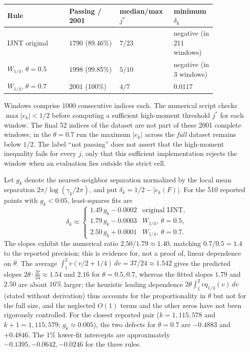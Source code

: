 \documentclass[11pt,a4paper]{article}
\numberwithin{equation}{section}
\theoremstyle{definition}
\theoremstyle{remark}
\begin{document}
\begin{center}\small
\begin{tabular}{@{}p{0.27\linewidth}p{0.22\linewidth}p{0.19\linewidth}p{0.17\linewidth}@{}}
\toprule
Rule & Passing / 2001 & median/max $j^*$ & minimum $\delta_k$\\
\midrule
IJNT original & $1790$ (89.46\%) & $7/23$ & negative (in 211 windows)\\
$W_{1/4}$, $\theta=0.5$ & $1998$ (99.85\%) & $5/10$ & negative (in 3 windows)\\
$W_{1/4}$, $\theta=0.7$ & $2001$ (100\%) & $4/7$ & $0.0117$\\
\bottomrule
\end{tabular}
\end{center}
Windows comprise 1000 consecutive indices each. The numerical script
checks $\max|e_k|<1/2$ before computing a sufficient high-moment
threshold $j^*$ for each window. The final 52 indices of the dataset
are not part of these 2001 complete windows; in the $\theta=0.7$
run the maximum $|e_k|$ across the \emph{full} dataset remains below $1/2$.
The label ``not passing'' does not assert that the high-moment
inequality fails for every $j$, only that this sufficient implementation
rejects the window when an evaluation lies outside the strict cell.

Let $g_k$ denote the nearest-neighbor separation normalized by the
local mean separation $2\pi/\log(\gamma_k/2\pi)$, and put
$\delta_k=1/2-|e_k(F)|$. For the 510 reported points with $g_k<0.05$,
least-squares fits are
\begin{equation}\label{eq:gfit-v3}
\delta_k\approx
\begin{cases}
1.49\,g_k-0.0002&\text{original IJNT},\\
1.79\,g_k-0.0003& W_{1/4},\ \theta=0.5,\\
2.50\,g_k+0.0001& W_{1/4},\ \theta=0.7.
\end{cases}
\end{equation}
The slopes exhibit the numerical ratio $2.50/1.79\approx1.40$,
matching $0.7/0.5=1.4$ to the reported precision; this is evidence for,
not a proof of, linear dependence on $\theta$. The average
$\int_1^2 v(v/2+1/4)\,dv=37/24\approx1.542$ gives the predicted slopes $2\theta\cdot\frac{37}{24}\approx1.54$ and $2.16$ for $\theta=0.5,0.7$, whereas the fitted slopes $1.79$ and $2.50$ are about $16\%$ larger; the heuristic leading dependence $2\theta\int_1^2 vq_{1/4}(v)\,dv$ (stated without derivation) thus accounts for the proportionality in $\theta$ but not for the full size, and the
neglected $O(1)$ terms and the other zeros have not been rigorously controlled.
For the closest reported pair ($k=1{,}115{,}578$ and $k+1=1{,}115{,}579$;
$g_k\approx0.005$), the two defects for $\theta=0.7$ are
$-0.4883$ and $+0.4846$.
The 1\% lower-fit intercepts are approximately
$-0.1395,-0.0642,-0.0246$ for the three rules.
\end{document}
